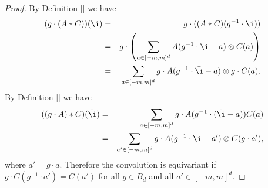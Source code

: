 \documentclass{article}
\theoremstyle{plain}
\begin{document}
\begin{proof}
By Definition \ref{} we have
\begin{eqnarray}
(g\cdot (A* C) )(\bar \i) &=& g\cdot( (A*C)(g^{-1} \cdot \bar \i)) \\
&=& g \cdot \left (\sum_{a\in [-m,m]^d} A(g^{-1}\cdot \bar \i - a) \otimes C(a)\right)\\
&=& \sum_{a\in [-m,m]^d} g \cdot A(g^{-1} \cdot \bar \i -a ) \otimes g \cdot C(a).
\end{eqnarray}
By Definition \ref{} we have
\begin{eqnarray}
((g\cdot A)* C) (\bar \i) &=& \sum_{a\in [-m,m]^d} g\cdot A(g^{-1} \cdot (\bar \i - a) ) C(a) \\
&=& \sum_{a'\in [-m,m]^d} g \cdot A(g^{-1}\cdot \bar \i -a') \otimes C(g\cdot a'),
\end{eqnarray}
where $a'=g\cdot a$. Therefore the convolution is equivariant if $g\cdot C(g^{-1} \cdot a') = C(a')$ for all $g\in B_d$ and all $a' \in [-m,m]^d$. 
\end{proof}
\end{document}
